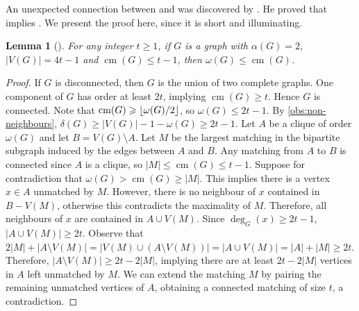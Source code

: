 \documentclass[11pt]{article}
\numberwithin{equation}{section}
\theoremstyle{plain}
\newtheorem{lem}[equation]{Lemma}
\theoremstyle{definition}
\DeclarePairedDelimiter{\floor}{\lfloor}{\rfloor}
\renewcommand{\geq}{\geqslant}
\renewcommand{\leq}{\leqslant}
\DeclareMathOperator{\cm}{cm}
\begin{document}
An unexpected connection between  and  was discovered by \citet{cambie2021hadwiger}. He proved that  implies . We present the proof here, since it is short and illuminating.
\begin{lem}[\citet{cambie2021hadwiger}]
    \label{lem:cambie1}
    For any integer $t \geq 1$, if $G$ is a graph with $\alpha(G) = 2$, $|V(G)| = 4t - 1$ and $\cm(G) \leq t - 1$, then $\omega(G) \leq \cm(G)$.
\end{lem}
\begin{proof}
    If $G$ is disconnected, then $G$ is the union of two complete graphs. One component of $G$ has order at least $2t$, implying $\cm(G) \geq t$.
    Hence $G$ is connected.
    Note that $\cm(G) \geq \floor{\omega(G) /2}$, so $\omega(G) \leq 2t-1$. By \cref{obs:non-neighbours}, $\delta(G) \geq |V(G)|-1 - \omega(G)\geq  2t-1$.
    Let $A$ be a clique of order $\omega(G)$ and let $B=V(G) \setminus A.$
    Let $M$ be the largest matching in the bipartite subgraph induced by the edges between $A$ and $B$. Any matching from $A$ to $B$ is connected since $A$ is a clique, so $\left|M\right| \leq \cm(G) \leq t-1$.
    Suppose for contradiction that $\omega(G) > \cm(G) \geq |M|$.
    This implies there is a vertex $x \in A$ unmatched by $M$. However, there is no neighbour of $x$ contained in $B - V(M)$, otherwise this contradicts the maximality of $M$. Therefore, all neighbours of $x$ are contained in $A \cup V(M)$. Since $\deg_G(x) \geq 2t - 1$, $|A \cup V(M)| \geq 2t$. Observe that
    $2|M| + |A \setminus V(M)| = |V(M) \cup (A \setminus V(M))| = |A \cup V(M)| = |A| + |M| \geq 2t$.
    Therefore, $|A \setminus V(M)| \geq 2t - 2|M|$, implying there are at least $2t - 2|M|$ vertices in $A$ left unmatched by $M$. We can extend the matching $M$ by pairing the remaining unmatched vertices of $A$, obtaining a connected matching of size $t$, a contradiction.
\end{proof}
\end{document}
